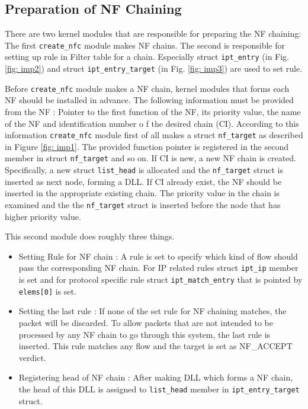 \subsection{Preparation of NF Chaining} 
There are two kernel modules that are responsible for preparing the NF chaining: The first {\tt create\_nfc} module makes NF chains. The second is responsible for setting up rule in Filter table for a chain. Especially struct {\tt ipt\_entry} (in Fig. \ref{fig: imp2}) and struct {\tt ipt\_entry\_target} (in Fig. \ref{fig: imp3}) are used to set rule. 

Before {\tt create\_nfc} module makes a NF chain, kernel modules that forms each NF should be installed in advance. The following information must be provided from the NF : Pointer to the first function of the NF, its priority value, the name of the NF and identification number o f the desired chain (CI). According to this information {\tt create\_nfc} module first of all makes a struct {\tt nf\_target} as described in Figure \ref{fig: imp1}. The provided function pointer is registered in the second member in struct {\tt nf\_target} and so on. If CI is new, a new NF chain is created. Specifically, a new struct {\tt list\_head} is allocated and the {\tt nf\_target} struct is inserted as next node, forming a DLL. If CI already exist, the NF should be inserted in the appropriate existing chain. The priority value in the chain is examined and the the {\tt nf\_target} struct is inserted before the node that has higher priority value.

This second module does roughly three things. 
\begin{itemize}
	\item Setting Rule for NF chain : A rule is set to specify which kind of flow should pass the corresponding NF chain. For IP related rules struct {\tt ipt\_ip} member is set and for protocol specific rule struct {\tt ipt\_match\_entry} that is pointed by {\tt elems[0]} is set. 
	\item Setting the last rule : If none of the set rule for NF chaining matches, the packet will be discarded. To allow packets that are not intended to be processed by any NF chain to go through this system, the last rule is inserted. This rule matches any flow and the target is set as NF\_ACCEPT verdict. 
	\item Registering head of NF chain : After making DLL which forms a NF chain, the head of this DLL is assigned to {\tt list\_head} member in {\tt ipt\_entry\_target} struct. 
\end{itemize}

